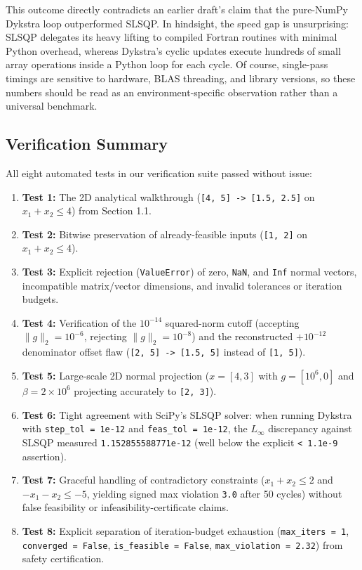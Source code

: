 \documentclass[11pt,a4paper]{article}
\begin{document}
This outcome directly contradicts an earlier draft's claim that the pure-NumPy Dykstra loop outperformed SLSQP. In hindsight, the speed gap is unsurprising: SLSQP delegates its heavy lifting to compiled Fortran routines with minimal Python overhead, whereas Dykstra's cyclic updates execute hundreds of small array operations inside a Python loop for each cycle. Of course, single-pass timings are sensitive to hardware, BLAS threading, and library versions, so these numbers should be read as an environment-specific observation rather than a universal benchmark.

\subsection{Verification Summary}
All eight automated tests in our verification suite passed without issue:
\begin{enumerate}[leftmargin=2em,itemsep=0.25em]
    \item \textbf{Test 1:} The 2D analytical walkthrough (\texttt{[4, 5] -> [1.5, 2.5]} on $x_1 + x_2 \le 4$) from Section 1.1.
    \item \textbf{Test 2:} Bitwise preservation of already-feasible inputs (\texttt{[1, 2]} on $x_1 + x_2 \le 4$).
    \item \textbf{Test 3:} Explicit rejection (\texttt{ValueError}) of zero, \texttt{NaN}, and \texttt{Inf} normal vectors, incompatible matrix/vector dimensions, and invalid tolerances or iteration budgets.
    \item \textbf{Test 4:} Verification of the $10^{-14}$ squared-norm cutoff (accepting $\|g\|_2 = 10^{-6}$, rejecting $\|g\|_2 = 10^{-8}$) and the reconstructed $+10^{-12}$ denominator offset flaw (\texttt{[2, 5] -> [1.5, 5]} instead of \texttt{[1, 5]}).
    \item \textbf{Test 5:} Large-scale 2D normal projection ($x = [4, 3]$ with $g = [10^6, 0]$ and $\beta = 2 \times 10^6$ projecting accurately to \texttt{[2, 3]}).
    \item \textbf{Test 6:} Tight agreement with SciPy's SLSQP solver: when running Dykstra with \texttt{step\_tol = 1e-12} and \texttt{feas\_tol = 1e-12}, the $L_\infty$ discrepancy against SLSQP measured \texttt{1.152855588771e-12} (well below the explicit \texttt{< 1.1e-9} assertion).
    \item \textbf{Test 7:} Graceful handling of contradictory constraints ($x_1 + x_2 \le 2$ and $-x_1 - x_2 \le -5$, yielding signed max violation \texttt{3.0} after 50 cycles) without false feasibility or infeasibility-certificate claims.
    \item \textbf{Test 8:} Explicit separation of iteration-budget exhaustion (\texttt{max\_iters = 1}, \texttt{converged = False}, \texttt{is\_feasible = False}, \texttt{max\_violation = 2.32}) from safety certification.
\end{enumerate}
\end{document}
